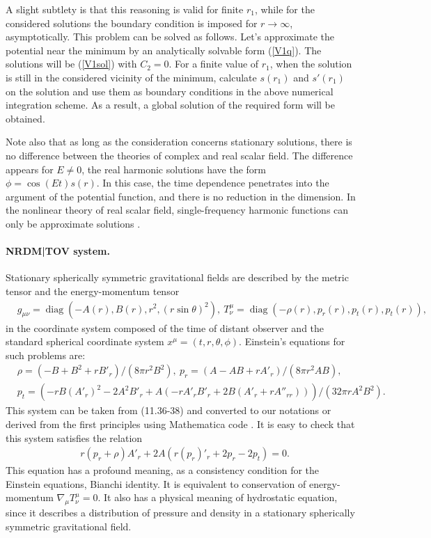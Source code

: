 \documentclass{article}
\def\diag{\mathop{\mbox{diag}}}
\begin{document}
A slight subtlety is that this reasoning is valid for finite $ r_1 $, while for the considered solutions the boundary condition is imposed for $ r \to \infty $, asymptotically. This problem can be solved as follows. Let's approximate the potential near the minimum by an analytically solvable form (\ref {V1q}). The solutions will be (\ref {V1sol}) with $ C_2 = 0 $. For a finite value of $ r_1 $, when the solution is still in the considered vicinity of the minimum, calculate $ s (r_1) $ and $ s' (r_1) $ on the solution and use them as boundary conditions in the above numerical integration scheme. As a result, a global solution of the required form will be obtained.

Note also that as long as the consideration concerns stationary solutions, there is no difference between the theories of complex and real scalar field. The difference appears for $ E \neq0 $, the real harmonic solutions have the form $ \phi = \cos (Et) s (r) $. In this case, the time dependence penetrates into the argument of the potential function, and there is no reduction in the dimension. In the nonlinear theory of real scalar field, single-frequency harmonic functions can only be approximate solutions \cite {1710.08910}.

\paragraph * {NRDM|TOV system.} Stationary spherically symmetric gravitational fields are described by the metric tensor and the energy-momentum tensor 
\begin{eqnarray}
&g_{\mu\nu}=\diag(-A(r),B(r),r^2,(r\sin\theta)^2),\ T^\mu_\nu=\diag(-\rho(r),p_r(r),p_t(r),p_t(r)),
\end{eqnarray}
in the coordinate system composed of the time of distant observer and the standard spherical coordinate system $ x ^ \mu = (t, r, \theta, \phi) $. Einstein's equations for such problems are: 
\begin{eqnarray}
&\rho=(-B + B^2 + r B'_r)/(8 \pi r^2 B^2), \ p_r=(A - A B + r A'_r)/(8 \pi r^2 A B),\\
&p_t=(-r B (A'_r)^2 - 2 A^2 B'_r + A (-r A'_r B'_r + 2 B (A'_r + r A''_{rr})))/(32 \pi r A^2 B^2).
\end{eqnarray}
This system can be taken from \cite{Visser1996} (11.36-38) and converted to our notations or derived from the first principles using Mathematica code \cite{Hartle}. It is easy to check that this system satisfies the relation 
\begin{eqnarray}
&r(p_r+\rho)A'_r+2A(r(p_r)'_r+2p_r-2p_t)=0. \label{hydroeq}
\end{eqnarray}
This equation has a profound meaning, as a consistency condition for the Einstein equations, Bianchi identity. It is equivalent to conservation of energy-momentum $\nabla_\mu T^\mu_\nu=0$. It also has a physical meaning of hydrostatic equation, since it describes a distribution of pressure and density in a stationary spherically symmetric gravitational field.
\end{document}
